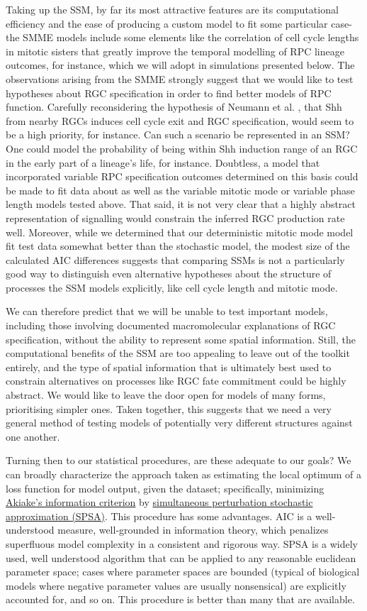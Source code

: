 Taking up the SSM, by far its most attractive features are its computational efficiency and the ease of producing a custom model to fit some particular case-  the SMME models include some elements like the correlation of cell cycle lengths in mitotic sisters that greatly improve the temporal modelling of RPC lineage outcomes, for instance, which we will adopt in simulations presented below. The observations arising from the SMME strongly suggest that we would like to test hypotheses about RGC specification in order to find better models of RPC function. Carefully reconsidering the hypothesis of Neumann et al. \cite{Neumann2000}, that Shh from nearby RGCs induces cell cycle exit and RGC specification, would seem to be a high priority, for instance. Can such a scenario be represented in an SSM? One could model the probability of being within Shh induction range of an RGC in the early part of a lineage's life, for instance. Doubtless, a model that incorporated variable RPC specification outcomes determined on this basis could be made to fit data about as well as the variable mitotic mode or variable phase length models tested above. That said, it is not very clear that a highly abstract representation of signalling would constrain the inferred RGC production rate well. Moreover, while we determined that our deterministic mitotic mode model fit test data somewhat better than the stochastic model, the modest size of the calculated AIC differences suggests that comparing SSMs is not a particularly good way to distinguish even alternative hypotheses about the structure of processes the SSM models explicitly, like cell cycle length and mitotic mode. 

We can therefore predict that we will be unable to test important models, including those involving documented macromolecular explanations of RGC specification, without the ability to represent some spatial information. Still, the computational benefits of the SSM are too appealing to leave out of the toolkit entirely, and the type of spatial information that is ultimately best used to constrain alternatives on processes like RGC fate commitment could be highly abstract. We would like to leave the door open for models of many forms, prioritising simpler ones. Taken together, this suggests that we need a very general method of testing models of potentially very different structures against one another.

Turning then to our statistical procedures, are these adequate to our goals? We can broadly characterize the approach taken as estimating the local optimum of a loss function for model output, given the dataset; specifically, minimizing \hyperref[AIC]{Akiake's information criterion} by \hyperref[SPSA]{simultaneous perturbation stochastic approximation (SPSA)}. This procedure has some advantages. AIC is a well-understood measure, well-grounded in information theory, which penalizes superfluous model complexity in a consistent and rigorous way. SPSA is a widely used, well understood algorithm that can be applied to any reasonable euclidean parameter space; cases where parameter spaces are bounded (typical of biological models where negative parameter values are usually nonsensical) are explicitly accounted for, and so on. This procedure is better than many that are available.

